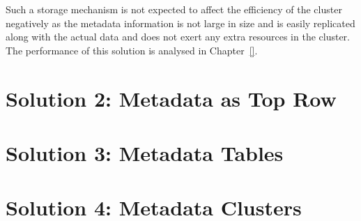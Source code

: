 	Such a storage mechanism is not expected to affect the efficiency of the
	cluster negatively as the metadata information is not large in size and is
	easily replicated along with the actual data and does not exert any extra
	resources in the cluster.  The performance of this solution is analysed  in
	Chapter~\ref{}. 
	
	
	
\section{Solution 2:  Metadata as Top Row}\label{s:sol2}



\section{Solution 3:  Metadata Tables}\label{s:sol3}



\section{Solution 4:  Metadata Clusters}\label{s:sol4}



